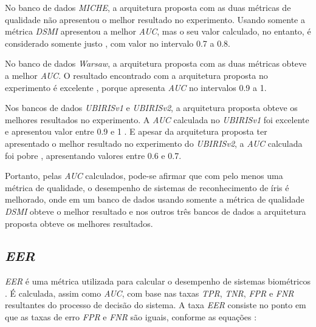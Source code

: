 \par No banco de dados \textit{MICHE}, a arquitetura proposta com as duas métricas de qualidade não apresentou o melhor resultado no experimento. Usando somente a métrica \textit{\acrshort{DSMI}} apresentou a melhor \textit{\acrshort{AUC}}, mas o seu valor calculado, no entanto, é considerado somente justo \cite{aucROC}, com valor no intervalo 0.7 a 0.8.

\par No banco de dados \textit{\acrshort{Warsaw}}, a arquitetura proposta com as duas métricas obteve a melhor \textit{\acrshort{AUC}}. O resultado encontrado com a arquitetura proposta no experimento é excelente \cite{aucROC}, porque apresenta \textit{\acrshort{AUC}} no intervalos 0.9 a 1.

\par Nos bancos de dados \textit{UBIRISv1} e \textit{UBIRISv2}, a arquitetura proposta obteve os melhores resultados no experimento. A \textit{\acrshort{AUC}} calculada no \textit{UBIRISv1} foi excelente e apresentou valor entre 0.9 e 1 \cite{aucROC}. E apesar da arquitetura proposta ter apresentado o melhor resultado no experimento do \textit{UBIRISv2}, a \textit{\acrshort{AUC}} calculada foi pobre \cite{aucROC}, apresentando valores entre 0.6 e 0.7.

\par Portanto, pelas \textit{\acrshort{AUC}} calculados, pode-se afirmar que com pelo menos uma métrica de qualidade, o desempenho de sistemas de reconhecimento de íris é melhorado, onde em um banco de dados usando somente a métrica de qualidade \textit{\acrshort{DSMI}} obteve o melhor resultado e nos outros três bancos de dados a arquitetura proposta obteve os melhores resultados. 

\FloatBarrier

\subsection{\textit{\acrfull{EER}}} \label{sec:experimentos:eer}

\par \textit{\acrshort{EER}} é uma métrica utilizada para calcular o desempenho de sistemas biométricos \cite{eer}. É calculada, assim como \textit{\acrshort{AUC}}, com base nas taxas \textit{\acrshort{TPR}}, \textit{\acrshort{TNR}}, \textit{\acrshort{FPR}} e \textit{\acrshort{FNR}} resultantes do processo de decisão do sistema. A taxa \textit{\acrshort{EER}} consiste no ponto em que as taxas de erro \textit{\acrshort{FPR}} e \textit{\acrshort{FNR}} são iguais, conforme as equações \cite{d33BEAT}:

